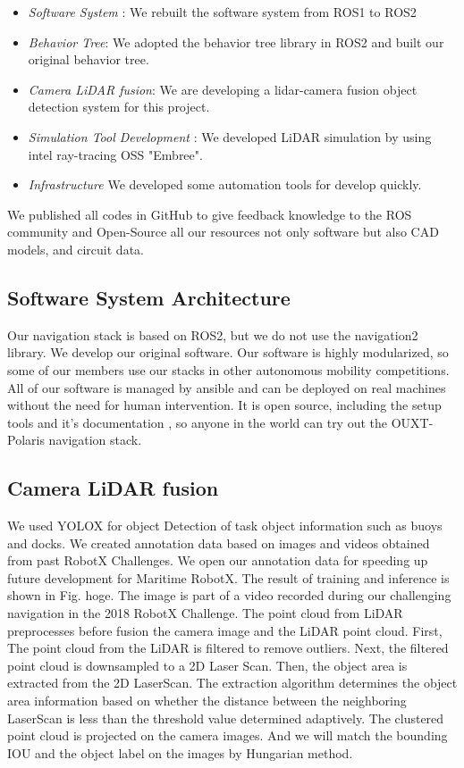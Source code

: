 \documentclass[lettersize,journal]{IEEEtran}
\begin{document}
\begin{itemize}
  \item {\it Software System }:
    We rebuilt the software system from ROS1 to ROS2
  \item {\it Behavior Tree}:
    We adopted the behavior tree library in ROS2 and built our original behavior tree.
  \item {\it Camera LiDAR fusion}:
    We are developing a lidar-camera fusion object detection system for this project.
  \item {\it Simulation Tool Development }:
    We developed LiDAR simulation by using intel ray-tracing OSS "Embree".
  \item {\it Infrastructure}
    We developed some automation tools for develop quickly.
\end{itemize}
We published all codes in GitHub to give feedback knowledge to the ROS community and 
Open-Source all our resources not only software \cite{documentation_software}
but also CAD models, and circuit data. \cite{documentation_hardware}

\subsection{Software System Architecture}
Our navigation stack is based on ROS2, but we do not use the navigation2 library. We develop our original software.
Our software is highly modularized, so some of our members use our stacks in other autonomous mobility competitions.
All of our software is managed by ansible and can be deployed on real machines without the need for human intervention.
It is open source, including the setup tools \cite{ouxt_automation} and it's documentation \cite{documentation_software},
so anyone in the world can try out the OUXT-Polaris navigation stack.

\subsection{Camera LiDAR fusion}
We used YOLOX\cite{YOLOX} for object Detection of task object information such as buoys and docks.
We created annotation data based on images and videos obtained from past RobotX Challenges.
We open our annotation data for speeding up future development for Maritime RobotX. \cite{dataset_annotations}
The result of training and inference is shown in Fig. hoge. 
The image is part of a video recorded during our challenging navigation in the 2018 RobotX Challenge.\cite{RobotX2018_video}
\indent The point cloud from LiDAR preprocesses before fusion the camera image and the LiDAR point cloud.
First, The point cloud from the LiDAR is filtered to remove outliers.
Next, the filtered point cloud is downsampled to a 2D Laser Scan.
Then, the object area is extracted from the 2D LaserScan. \cite{scan_segmentation}
The extraction algorithm determines the object area information based on whether the distance between 
the neighboring LaserScan is less than the threshold value determined adaptively.
The clustered point cloud is projected on the camera images.
And we will match the bounding IOU and the object label on the images by Hungarian method.
\end{document}
